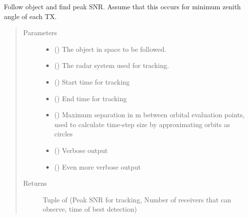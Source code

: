 \documentclass[letterpaper,10pt,english]{sphinxmanual}
\begin{document}
\begin{fulllineitems}
\label{\detokenize{modules/population_filter:population_filter.get_passes_simple}}
Follow object and find peak SNR. Assume that this occurs for minimum zenith angle of each TX.
\begin{quote}\begin{description}
\item[{Parameters}] \leavevmode\begin{itemize}
\item {} 
 ({\hyperref[\detokenize{modules/space_object:space_object.SpaceObject}]{}}) \textendash{} The object in space to be followed.

\item {} 
 ({\hyperref[\detokenize{modules/radar_config:radar_config.RadarSystem}]{}}) \textendash{} The radar system used for tracking.

\item {} 
 () \textendash{} Start time for tracking

\item {} 
 () \textendash{} End time for tracking

\item {} 
 () \textendash{} Maximum separation in m between orbital evaluation points, used to calculate time-step size by approximating orbits as circles

\item {} 
 () \textendash{} Verbose output

\item {} 
 () \textendash{} Even more verbose output

\end{itemize}

\item[{Returns}] \leavevmode
Tuple of (Peak SNR for tracking, Number of receivers that can observe, time of best detection)

\end{description}\end{quote}

\end{fulllineitems}
\end{document}
